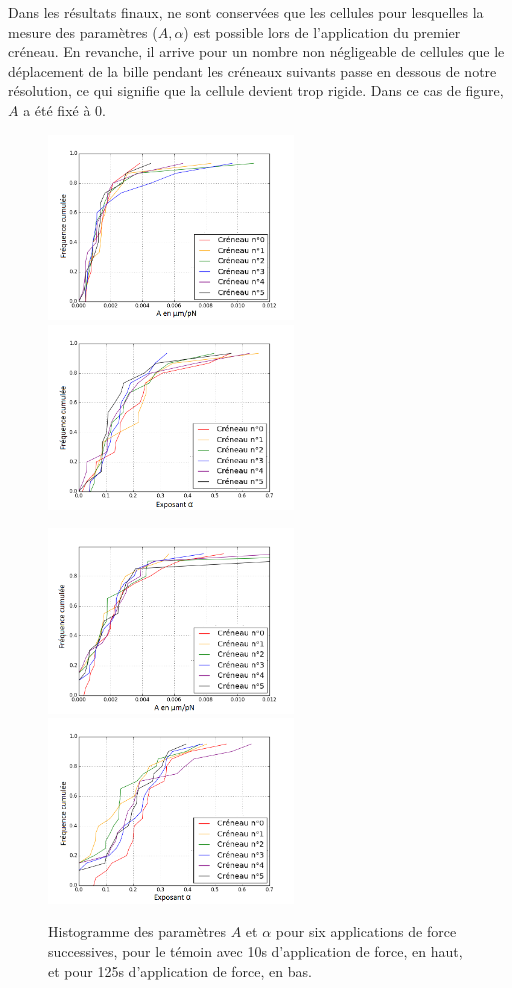 \documentclass{report}
\begin{document}
Dans les résultats finaux, ne sont conservées que les cellules pour lesquelles la mesure des paramètres ($A, \alpha$) est possible lors de l'application du premier créneau. 
En revanche, il arrive pour un nombre non négligeable de cellules que le déplacement de la bille pendant les créneaux suivants passe en dessous de notre résolution, ce qui signifie que la cellule devient trop rigide. Dans ce cas de figure, $A$ a été fixé à 0. 
\begin{center}
\begin{figure}[p]
\includegraphics[width=6.5cm]{Figures/A_creneaux_temoin.png}
\includegraphics[width=6.5cm]{Figures/E_creneaux_temoin.png} 

\includegraphics[width=6.5cm]{Figures/A_creneaux_S2.png} 
\includegraphics[width=6.5cm]{Figures/E_creneaux_S2.png} 
\caption{\label{Evolution_6c} Histogramme des paramètres $A$ et $\alpha$ pour six applications de force successives, pour le témoin avec 10s d’application de force, en haut, et pour 125s d’application de force, en bas.}
\end{figure}
\end{center}
\end{document}
